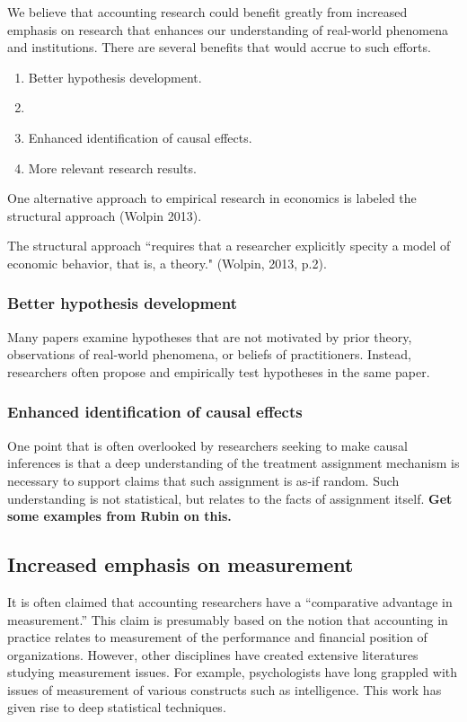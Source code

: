 \documentclass[11pt]{amsart}
\begin{document}
We believe that accounting research could benefit greatly from increased emphasis on research that enhances our understanding of real-world phenomena and institutions. There are several benefits that would accrue to such efforts.

\begin{enumerate}
\item Better hypothesis development.  
\item %
\item Enhanced identification of causal effects.
\item More relevant research results.
\end{enumerate}

One alternative approach to empirical research in economics is labeled the structural approach (Wolpin 2013).

The structural approach ``requires that a researcher explicitly specity a model of economic behavior, that is, a theory." (Wolpin, 2013, p.2).


\subsubsection{Better hypothesis development}
Many papers examine hypotheses that are not motivated by prior theory,  observations of real-world phenomena, or beliefs of practitioners. Instead, researchers often propose and empirically test hypotheses in the same paper.

\subsubsection{Enhanced identification of causal effects}
One point that is often overlooked by researchers seeking to make causal inferences is that a deep understanding of the treatment assignment mechanism is necessary to support claims that such assignment is as-if random. Such understanding is not statistical, but relates to the facts of assignment itself. \textbf{Get some examples from Rubin on this.}

\subsection{Increased emphasis on measurement}
It is often claimed that accounting researchers have a ``comparative advantage in measurement.'' This claim is presumably based on the notion that accounting in practice relates to measurement of the performance and financial position of organizations. However, other disciplines have created extensive literatures studying measurement issues. For example, psychologists have long grappled with issues of measurement of various constructs such as intelligence. This work has given rise to deep statistical techniques.
\end{document}
